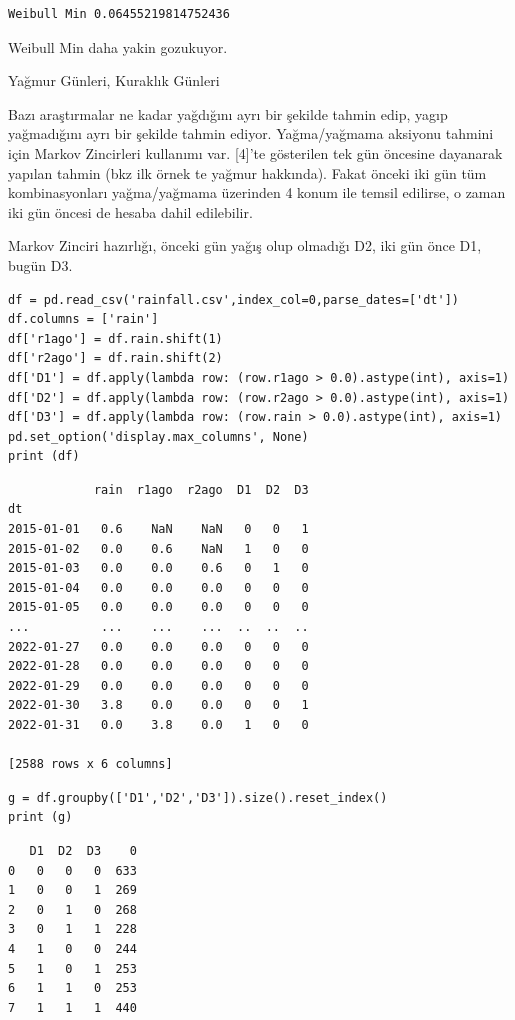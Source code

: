 \documentclass[12pt,fleqn]{article}\usepackage{../../common}
\begin{document}
\begin{verbatim}
Weibull Min 0.06455219814752436
\end{verbatim}

Weibull Min daha yakin gozukuyor.

Yağmur Günleri, Kuraklık Günleri

Bazı araştırmalar ne kadar yağdığını ayrı bir şekilde tahmin edip, yagıp
yağmadığını ayrı bir şekilde tahmin ediyor. Yağma/yağmama aksiyonu tahmini için
Markov Zincirleri kullanımı var. [4]'te gösterilen tek gün öncesine dayanarak
yapılan tahmin (bkz ilk örnek te yağmur hakkında). Fakat önceki iki gün tüm
kombinasyonları yağma/yağmama üzerinden 4 konum ile temsil edilirse, o zaman iki
gün öncesi de hesaba dahil edilebilir.

Markov Zinciri hazırlığı, önceki gün yağış olup olmadığı D2, iki gün önce D1,
bugün D3.

\begin{verbatim}
df = pd.read_csv('rainfall.csv',index_col=0,parse_dates=['dt'])
df.columns = ['rain']
df['r1ago'] = df.rain.shift(1)
df['r2ago'] = df.rain.shift(2)
df['D1'] = df.apply(lambda row: (row.r1ago > 0.0).astype(int), axis=1)
df['D2'] = df.apply(lambda row: (row.r2ago > 0.0).astype(int), axis=1)
df['D3'] = df.apply(lambda row: (row.rain > 0.0).astype(int), axis=1)
pd.set_option('display.max_columns', None)
print (df)
\end{verbatim}

\begin{verbatim}
            rain  r1ago  r2ago  D1  D2  D3
dt                                        
2015-01-01   0.6    NaN    NaN   0   0   1
2015-01-02   0.0    0.6    NaN   1   0   0
2015-01-03   0.0    0.0    0.6   0   1   0
2015-01-04   0.0    0.0    0.0   0   0   0
2015-01-05   0.0    0.0    0.0   0   0   0
...          ...    ...    ...  ..  ..  ..
2022-01-27   0.0    0.0    0.0   0   0   0
2022-01-28   0.0    0.0    0.0   0   0   0
2022-01-29   0.0    0.0    0.0   0   0   0
2022-01-30   3.8    0.0    0.0   0   0   1
2022-01-31   0.0    3.8    0.0   1   0   0

[2588 rows x 6 columns]
\end{verbatim}

\begin{verbatim}
g = df.groupby(['D1','D2','D3']).size().reset_index()
print (g)
\end{verbatim}

\begin{verbatim}
   D1  D2  D3    0
0   0   0   0  633
1   0   0   1  269
2   0   1   0  268
3   0   1   1  228
4   1   0   0  244
5   1   0   1  253
6   1   1   0  253
7   1   1   1  440
\end{verbatim}
\end{document}
